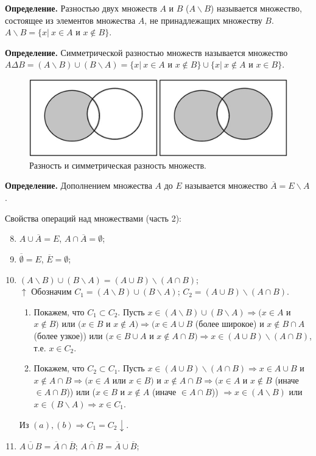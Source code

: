 \documentclass{article}
\begin{document}
    \textbf{Определение.} Разностью двух множеств $A$ и $B$ ($A \backslash B$) называется множество, состоящее из элементов множества $A$, не принадлежащих множеству $B$. $A \backslash B = \{x|\ x \in A \textrm{ и } x \not\in B\}$. 

    \textbf{Определение.} Симметрической разностью множеств называется множество $A \Delta B = (A \backslash B) \cup (B \backslash A) = \{x|\ x \in A \textrm{ и } x \not\in B\} \cup \{x|\ x \not\in A \textrm{ и } x \in B\}$. 

    \begin{figure}[h!]
    \centering
    \includegraphics{2}
    \caption{\label{fig:fig2}Разность и симметрическая разность множеств.}
    \end{figure}

    \textbf{Определение.} Дополнением множества $A$ до $E$ называется множество $\overline{A} = E \backslash A$.  

    Свойства операций над множествами (часть 2):
	\begin{enumerate}
        \setcounter{enumi}{7}
        \item $A \cup \overline{A} = E$, $A \cap \overline{A} = \emptyset$;
        \item $\overline{\emptyset} = E$, $\overline{E} = \emptyset$;
        \item $(A \backslash B) \cup (B \backslash A) = (A \cup B) \backslash (A \cap B)$;\\
        $\uparrow$ Обозначим $C_1 = (A \backslash B) \cup (B \backslash A)$; $C_2 = (A \cup B) \backslash (A \cap B)$.
        \begin{enumerate}
            \item Покажем, что $C_1 \subset C_2$. Пусть $x \in (A \backslash B) \cup (B \backslash A) \Rightarrow (x \in A$ и $x \not\in B)$ или $(x \in B$ и $x \not\in A) \Rightarrow (x \in A \cup B$ (более широкое) и $x \not\in B \cap A$ (более узкое)) или $(x \in B \cup A$ и $x \not\in A \cap B) \Rightarrow x \in (A \cup B) \backslash (A \cap B)$, т.е. $x \in C_2$.
            \item Покажем, что $C_2 \subset C_1$. Пусть $x \in (A \cup B) \backslash (A \cap B) \Rightarrow x \in A \cup B$ и $x \not\in A \cap B \Rightarrow (x \in A$ или $x \in B)$ и $x \not\in A \cap B \Rightarrow (x \in A$ и $x \not\in B$ (иначе $\in A \cap B$)) или ($x \in B$ и $x \not\in A$ (иначе $\in A \cap B$)) $\Rightarrow x \in (A \backslash B)$ или $x \in (B \backslash A) \Rightarrow x \in C_1$.
        \end{enumerate}
        Из $(a),(b) \Rightarrow C_1 = C_2 \downarrow.$ 
        \item $\overline{A \cup B} = \overline{A}\cap\overline{B}$; $\overline{A \cap B} = \overline{A}\cup\overline{B}$;
    \end{enumerate}
\end{document}

